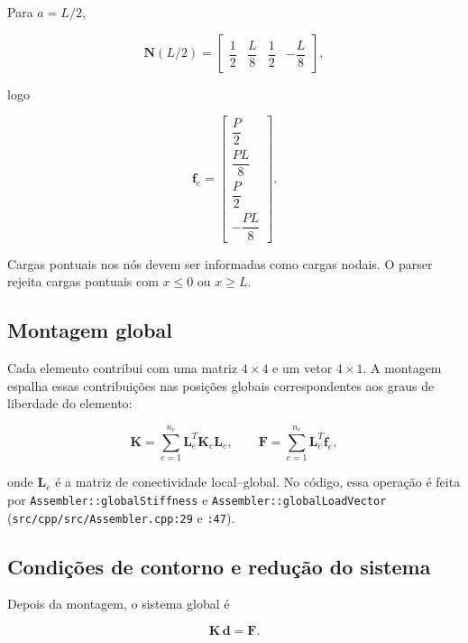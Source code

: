 \documentclass[12pt,a4paper]{article}
\begin{document}
Para \(a=L/2\),

\begin{equation}
  \mathbf{N}(L/2) =
  \begin{bmatrix}
    \dfrac{1}{2} & \dfrac{L}{8} & \dfrac{1}{2} & -\dfrac{L}{8}
  \end{bmatrix},
  \label{eq:Nmeio}
\end{equation}

logo

\begin{equation}
  \mathbf{f}_e =
  \begin{bmatrix}
    \dfrac{P}{2}\\[1ex]
    \dfrac{PL}{8}\\[1ex]
    \dfrac{P}{2}\\[1ex]
    -\dfrac{PL}{8}
  \end{bmatrix}.
  \label{eq:fe_point_meio}
\end{equation}

Cargas pontuais nos nós devem ser informadas como cargas nodais. O parser rejeita cargas pontuais com \(x\le 0\) ou \(x\ge L\).

\subsection{Montagem global}
\label{sec:montagem}

Cada elemento contribui com uma matriz \(4\times 4\) e um vetor \(4\times 1\). A montagem espalha essas contribuições nas posições globais correspondentes aos graus de liberdade do elemento:

\begin{equation}
  \mathbf{K} = \sum_{e=1}^{n_e} \mathbf{L}_e^T \mathbf{K}_e \mathbf{L}_e,
  \qquad
  \mathbf{F} = \sum_{e=1}^{n_e} \mathbf{L}_e^T \mathbf{f}_e,
  \label{eq:montagem}
\end{equation}

onde \(\mathbf{L}_e\) é a matriz de conectividade local--global. No código, essa operação é feita por \texttt{Assembler::globalStiffness} e \texttt{Assembler::globalLoadVector} (\texttt{src/cpp/src/Assembler.cpp:29} e \texttt{:47}).

\subsection{Condições de contorno e redução do sistema}
\label{sec:cc}

Depois da montagem, o sistema global é

\begin{equation}
  \mathbf{K}\,\mathbf{d} = \mathbf{F}.
  \label{eq:sistema_global}
\end{equation}
\end{document}
